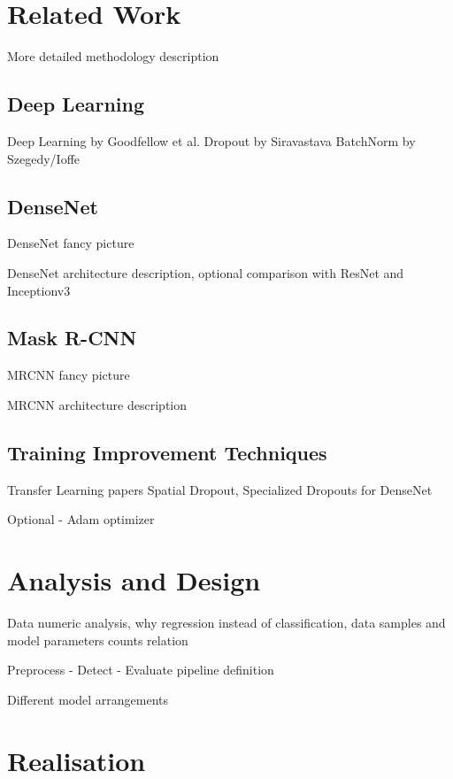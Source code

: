 \documentclass[thesis=B,english]{FITthesis}[2019/12/23]
\begin{document}
\chapter{Related Work}

More detailed methodology description

\section{Deep Learning}

Deep Learning by Goodfellow et al.
Dropout by Siravastava
BatchNorm by Szegedy/Ioffe

\section{DenseNet}

DenseNet fancy picture

DenseNet architecture description, optional comparison with ResNet and Inceptionv3

\section{Mask R-CNN}

MRCNN fancy picture

MRCNN architecture description

\section{Training Improvement Techniques}

Transfer Learning papers
Spatial Dropout, Specialized Dropouts for DenseNet

Optional - Adam optimizer

\chapter{Analysis and Design}

Data numeric analysis, why regression instead of classification, data samples and model parameters counts relation

Preprocess - Detect - Evaluate pipeline definition

Different model arrangements

\chapter{Realisation}
\end{document}
